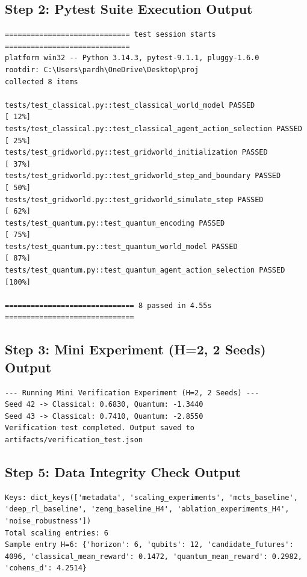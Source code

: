 \documentclass[10pt,article]{article}
\begin{document}
\subsection{Step 2: Pytest Suite Execution Output}
\begin{lstlisting}[caption={Live Terminal Output of pytest Suite}]
============================= test session starts =============================
platform win32 -- Python 3.14.3, pytest-9.1.1, pluggy-1.6.0
rootdir: C:\Users\pardh\OneDrive\Desktop\proj
collected 8 items

tests/test_classical.py::test_classical_world_model PASSED               [ 12%]
tests/test_classical.py::test_classical_agent_action_selection PASSED    [ 25%]
tests/test_gridworld.py::test_gridworld_initialization PASSED            [ 37%]
tests/test_gridworld.py::test_gridworld_step_and_boundary PASSED         [ 50%]
tests/test_gridworld.py::test_gridworld_simulate_step PASSED             [ 62%]
tests/test_quantum.py::test_quantum_encoding PASSED                      [ 75%]
tests/test_quantum.py::test_quantum_world_model PASSED                   [ 87%]
tests/test_quantum.py::test_quantum_agent_action_selection PASSED        [100%]

============================== 8 passed in 4.55s ==============================
\end{lstlisting}

\subsection{Step 3: Mini Experiment (H=2, 2 Seeds) Output}
\begin{lstlisting}[caption={Terminal Output of Mini Experiment}]
--- Running Mini Verification Experiment (H=2, 2 Seeds) ---
Seed 42 -> Classical: 0.6830, Quantum: -1.3440
Seed 43 -> Classical: 0.7410, Quantum: -2.8550
Verification test completed. Output saved to artifacts/verification_test.json
\end{lstlisting}

\subsection{Step 5: Data Integrity Check Output}
\begin{lstlisting}[caption={Data Integrity Verification Output}]
Keys: dict_keys(['metadata', 'scaling_experiments', 'mcts_baseline', 'deep_rl_baseline', 'zeng_baseline_H4', 'ablation_experiments_H4', 'noise_robustness'])
Total scaling entries: 6
Sample entry H=6: {'horizon': 6, 'qubits': 12, 'candidate_futures': 4096, 'classical_mean_reward': 0.1472, 'quantum_mean_reward': 0.2982, 'cohens_d': 4.2514}
\end{lstlisting}
\end{document}
